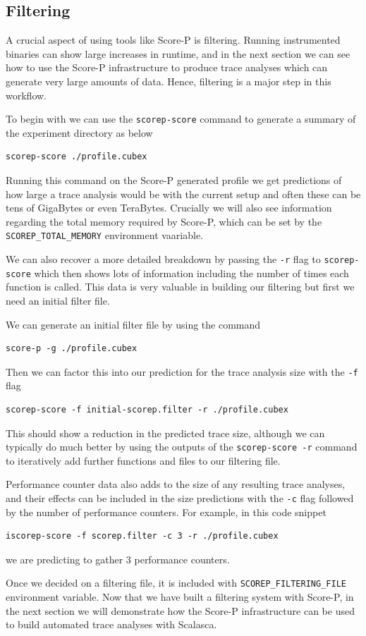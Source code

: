 \subsection{Filtering}

A crucial aspect of using tools like Score-P is filtering. Running instrumented
binaries can show large increases in runtime, and in the next section we can
see how to use the Score-P infrastructure to produce trace analyses which can
generate very large amounts of data. Hence, filtering is a major step in this
workflow.

To begin with we can use the \texttt{scorep-score} command to generate a
summary of the experiment directory as below
\begin{verbatim}
scorep-score ./profile.cubex
\end{verbatim}
Running this command on the Score-P generated profile we get predictions of how
large a trace analysis would be with the current setup and often these can be
tens of GigaBytes or even TeraBytes. Crucially we will also see information
regarding the total memory required by Score-P, which can be set by the
\texttt{SCOREP\_TOTAL\_MEMORY} environment vaariable.

We can also recover a more detailed
breakdown by passing the \texttt{-r} flag to \texttt{scorep-score} which then
shows lots of information including the number of times each function is
called. This data is very valuable in building our filtering but first we need
an initial filter file.

We can generate an initial filter file by using the command
\begin{verbatim}
score-p -g ./profile.cubex
\end{verbatim}
Then we can factor this into our prediction for the trace analysis size with
the \texttt{-f} flag
\begin{verbatim}
scorep-score -f initial-scorep.filter -r ./profile.cubex
\end{verbatim}
This should show a reduction in the predicted trace size, although we can
typically do much better by using the outputs of the \texttt{scorep-score -r}
command to iteratively add further functions and files to our filtering file.

Performance counter data also adds to the size of any resulting trace analyses,
and their effects can be included in the size predictions with the \texttt{-c}
flag followed by the number of performance counters. For example, in this code
snippet
\begin{verbatim}
iscorep-score -f scorep.filter -c 3 -r ./profile.cubex
\end{verbatim}
we are predicting to gather 3 performance counters.

Once we decided on a filtering file, it is included with
\texttt{SCOREP\_FILTERING\_FILE} environment variable. Now that we have built a
filtering system with Score-P, in the next section we will demonstrate how the
Score-P infrastructure can be used to build automated trace analyses with
Scalasca.
